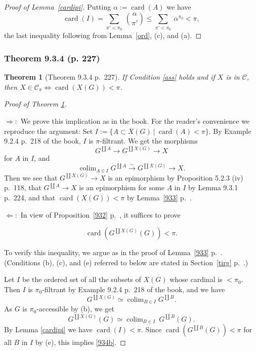 \documentclass[12pt]{article}%
\newtheorem{thm}{Theorem}%
\theoremstyle{remark}
\theoremstyle{definition}
\newcommand{\nn}{\noindent}
\newcommand{\C}{\mathcal C}
\newcommand{\then}{\Rightarrow}
\newcommand{\si}{\Leftarrow}
\newcommand{\ssi}{\Leftrightarrow}%
\newcommand{\xr}{\xrightarrow}
\DeclareMathOperator*{\colim}{colim}
\DeclareMathOperator{\card}{card}%
\begin{document}
\begin{proof}[Proof of Lemma~\ref{cardipi}] 
Putting $\alpha:=\card(A)$ we have
$$
\card(I)=\sum_{\pi'<\pi_0}\ \binom{\alpha}{\pi'}\le\sum_{\pi'<\pi_0}\ \alpha^{\pi_0}<\pi,
$$ 
the last inequality following from Lemma~\ref{ord}, (c), and (a). 
\end{proof}

\subsubsection{Theorem 9.3.4 (p. 227)}

\begin{thm}[Theorem 9.3.4 p.~227]\label{934}
If Condition \ref{ass} holds and if $X$ is in $\C$, then $X\in\C_\pi\ssi\card(X(G))<\pi$.
\end{thm}

\begin{proof}[Proof of Theorem \ref{934}]${}$

\nn$\then:$ We prove this implication as in the book. For the reader's convenience we reproduce the argument: Set $I:=\{A\subset X(G)\ |\ \card(A)<\pi\}$. By Example 9.2.4 p.~218 of the book, $I$ is $\pi$-filtrant. We get the morphisms 
$$
G^{\coprod A}\to G^{\coprod X(G)}\to X
$$ 
for $A$ in $I$, and 
$$
\colim_{A\in I}G^{\coprod A}\xr\sim G^{\coprod X(G)}\to X.
$$ 
Then we see that $G^{\coprod X(G)}\to X$ is an epimorphism by Proposition 5.2.3 (iv) p.~118, that $G^{\coprod A}\to X$ is an epimorphism for some $A$ in $I$ by Lemma 9.3.1 p.~224, and that $\card(X(G))<\pi$ by Lemma~\ref{933} p.~\pageref{933}.

\nn$\si:$ In view of Proposition~\ref{932} p.~\pageref{932}, it suffices to prove  

\begin{equation}\label{934b}
\card(G^{\coprod X(G)}(G))<\pi.
\end{equation} 

To verify this inequality, we argue as in the proof of Lemma~\ref{933} p.~\pageref{933}. (Conditions (b), (c), and (e) referred to below are stated in Section~\ref{tirg} p.~\pageref{tirg}.)

Let $I$ be the ordered set of all the subsets of $X(G)$ whose cardinal is $<\pi_0$. Then $I$ is $\pi_0$-filtrant by Example 9.2.4 p.~218 of the book, and we have 
$$
G^{\coprod X(G)}\simeq\colim_{B\in I}G^{\coprod B}.
$$ 
As $G$ is $\pi_0$-accessible by (b), we get 
$$
G^{\coprod X(G)}(G)\simeq\colim_{B\in I}\ G^{\coprod B}(G).
$$ 
By Lemma \ref{cardipi} we have $\card(I)<\pi$. Since $\card(G^{\coprod B}(G))<\pi$ for all $B$ in $I$ by (e), this implies \eqref{934b}.
\end{proof}
\end{document}

